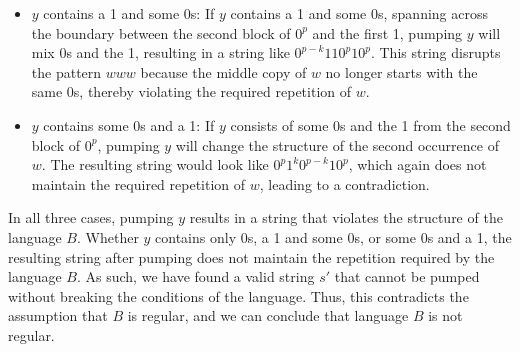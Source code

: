 \documentclass[12pt]{article}
\begin{document}
\begin{itemize}
\begin{itemize}
    \item $y$ contains a 1 and some 0s: If $y$ contains a 1 and some 0s, spanning across the boundary between the second block of $0^p$ and the first 1, pumping $y$ will mix 0s and the 1, resulting in a string like $0^{p-k}110^p10^p$. This string disrupts the pattern $www$ because the middle copy of $w$ no longer starts with the same 0s, thereby violating the required repetition of $w$.
    
    \item $y$ contains some 0s and a 1: If $y$ consists of some 0s and the 1 from the second block of $0^p$, pumping $y$ will change the structure of the second occurrence of $w$. The resulting string would look like $0^p1^k0^{p-k}10^p$, which again does not maintain the required repetition of $w$, leading to a contradiction.
\end{itemize}

In all three cases, pumping $y$ results in a string that violates the structure of the language $B$. Whether $y$ contains only 0s, a 1 and some 0s, or some 0s and a 1, the resulting string after pumping does not maintain the repetition required by the language $B$. As such, we have found a valid string $s'$ that cannot be pumped without breaking the conditions of the language. Thus, this contradicts the assumption that $B$ is regular, and we can conclude that language $B$ is not regular.
\end{itemize}

\vspace{12pt}
\end{document}
